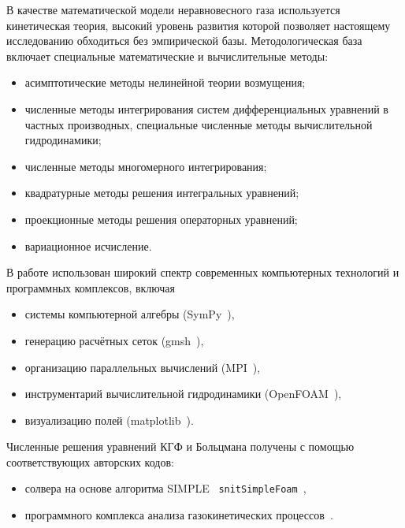 {\methods}
В качестве математической модели неравновесного газа используется кинетическая теория,
высокий уровень развития которой позволяет настоящему исследованию обходиться без эмпирической базы.
Методологическая база включает специальные математические и вычислительные методы:
\begin{itemize}
    \item асимптотические методы нелинейной теории возмущения;
    \item численные методы интегрирования систем дифференциальных уравнений в частных производных,
    специальные численные методы вычислительной гидродинамики;
    \item численные методы многомерного интегрирования;
    \item квадратурные методы решения интегральных уравнений;
    \item проекционные методы решения операторных уравнений;
    \item вариационное исчисление.
\end{itemize}
В работе использован широкий спектр современных компьютерных технологий и программных комплексов, включая
\begin{itemize}
    \item системы компьютерной алгебры (SymPy~\autocite{sympy}),
    \item генерацию расчётных сеток (gmsh~\autocite{gmsh}),
    \item организацию параллельных вычислений (MPI~\autocite{mpi}),
    \item инструментарий вычислительной гидродинамики (OpenFOAM~\autocite{openfoam}),
    \item визуализацию полей (matplotlib~\autocite{matplotlib}).
\end{itemize}
Численные решения уравнений КГФ и Больцмана получены с помощью соответствующих авторских кодов:
\begin{itemize}
    \item солвера на основе алгоритма SIMPLE~\autocite{SIMPLE} \verb+snitSimpleFoam+~\cite{Rogozin2014},
    \item программного комплекса анализа газокинетических процессов~\cite{Rogozin2010, Rogozin2011}.
\end{itemize}

